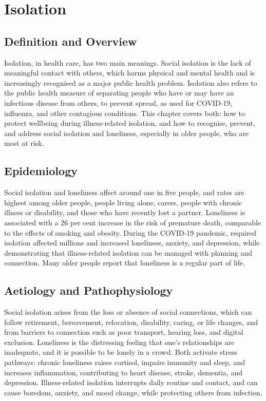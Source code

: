 \chapter{Isolation}

\section*{Definition and Overview}
Isolation, in health care, has two main meanings. Social isolation is the lack of meaningful contact with others, which harms physical and mental health and is increasingly recognised as a major public health problem. Isolation also refers to the public health measure of separating people who have or may have an infectious disease from others, to prevent spread, as used for COVID-19, influenza, and other contagious conditions. This chapter covers both: how to protect wellbeing during illness-related isolation, and how to recognise, prevent, and address social isolation and loneliness, especially in older people, who are most at risk.

\section*{Epidemiology}
Social isolation and loneliness affect around one in five people, and rates are highest among older people, people living alone, carers, people with chronic illness or disability, and those who have recently lost a partner. Loneliness is associated with a 26 per cent increase in the risk of premature death, comparable to the effects of smoking and obesity. During the COVID-19 pandemic, required isolation affected millions and increased loneliness, anxiety, and depression, while demonstrating that illness-related isolation can be managed with planning and connection. Many older people report that loneliness is a regular part of life.

\section*{Aetiology and Pathophysiology}
Social isolation arises from the loss or absence of social connections, which can follow retirement, bereavement, relocation, disability, caring, or life changes, and from barriers to connection such as poor transport, hearing loss, and digital exclusion. Loneliness is the distressing feeling that one's relationships are inadequate, and it is possible to be lonely in a crowd. Both activate stress pathways: chronic loneliness raises cortisol, impairs immunity and sleep, and increases inflammation, contributing to heart disease, stroke, dementia, and depression. Illness-related isolation interrupts daily routine and contact, and can cause boredom, anxiety, and mood change, while protecting others from infection.

